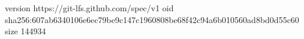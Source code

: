 version https://git-lfs.github.com/spec/v1
oid sha256:607ab6340106e6ec79be9c147c1960808be68f42c94a6b010560ad8bd0d55c60
size 144934
